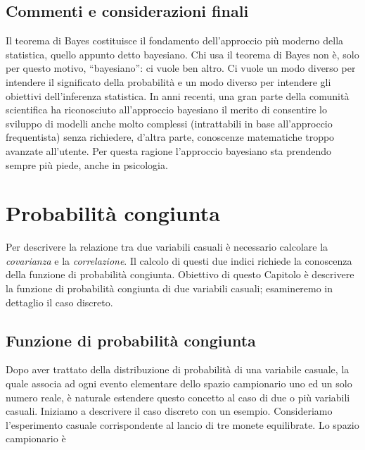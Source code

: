 \documentclass[
  11pt,
]{krantz}
\theoremstyle{definition}
\theoremstyle{definition}
\theoremstyle{definition}
\theoremstyle{definition}
\theoremstyle{remark}
\begin{document}
\hypertarget{commenti-e-considerazioni-finali-2}{%
\section*{Commenti e considerazioni finali}\label{commenti-e-considerazioni-finali-2}}


Il teorema di Bayes costituisce il fondamento dell'approccio più moderno della statistica, quello appunto detto bayesiano. Chi usa il teorema di Bayes non è, solo per questo motivo, ``bayesiano'': ci vuole ben altro. Ci vuole un modo diverso per intendere il significato della probabilità e un modo diverso per intendere gli obiettivi dell'inferenza statistica. In anni recenti, una gran parte della comunità scientifica ha riconosciuto all'approccio bayesiano il merito di consentire lo sviluppo di modelli anche molto complessi (intrattabili in base all'approccio frequentista) senza richiedere, d'altra parte, conoscenze matematiche troppo avanzate all'utente. Per questa ragione l'approccio bayesiano sta prendendo sempre più piede, anche in psicologia.

\hypertarget{chapter-prob-congiunta}{%
\chapter{Probabilità congiunta}\label{chapter-prob-congiunta}}

Per descrivere la relazione tra due variabili casuali è necessario calcolare la \emph{covarianza} e la \emph{correlazione}. Il calcolo di questi due indici richiede la conoscenza della funzione di probabilità congiunta. Obiettivo di questo Capitolo è descrivere la funzione di probabilità congiunta di due variabili casuali; esamineremo in dettaglio il caso discreto.

\hypertarget{funzione-di-probabilituxe0-congiunta}{%
\section{Funzione di probabilità congiunta}\label{funzione-di-probabilituxe0-congiunta}}

Dopo aver trattato della distribuzione di probabilità di una variabile casuale, la quale associa ad ogni evento elementare dello spazio campionario uno ed un solo numero reale, è naturale estendere questo concetto al caso di due o più variabili casuali. Iniziamo a descrivere il caso discreto con un esempio. Consideriamo l'esperimento casuale corrispondente al lancio di tre monete equilibrate. Lo spazio campionario è
\end{document}
